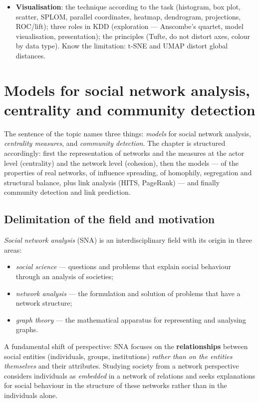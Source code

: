 \documentclass[11pt,a4paper]{article}
\theoremstyle{definition}
\begin{document}
\begin{itemize}
      interestingness of the patterns, and the user's evaluation. The first two are objective, the
      third subjective. \textbf{Four criteria of interesting knowledge}: comprehensibility,
      validity, usefulness, novelty.
\item \textbf{Visualisation}: the technique according to the task (histogram, box plot, scatter,
      SPLOM, parallel coordinates, heatmap, dendrogram, projections, ROC/lift); three roles in KDD
      (exploration --- Anscombe's quartet, model visualisation, presentation); the principles
      (Tufte, do not distort axes, colour by data type). Know the limitation: t-SNE and UMAP distort
      global distances.
\end{itemize}

\newpage
\section{Models for social network analysis, centrality and community detection}
\label{sec:sna}

The sentence of the topic names three things: \emph{models} for social network analysis,
\emph{centrality measures}, and \emph{community detection}. The chapter is structured accordingly:
first the representation of networks and the measures at the actor level (centrality) and the
network level (cohesion), then the models --- of the properties of real networks, of influence
spreading, of homophily, segregation and structural balance, plus link analysis (HITS, PageRank)
--- and finally community detection and link prediction.

\subsection{Delimitation of the field and motivation}

\begin{defbox}
\emph{Social network analysis} (SNA) is an interdisciplinary field with its origin in three areas:
\begin{itemize}
\item \emph{social science} --- questions and problems that explain social behaviour through an
      analysis of societies;
\item \emph{network analysis} --- the formulation and solution of problems that have a network
      structure;
\item \emph{graph theory} --- the mathematical apparatus for representing and analysing graphs.
\end{itemize}
A fundamental shift of perspective: SNA focuses on the \textbf{relationships} between social
entities (individuals, groups, institutions) \emph{rather than on the entities themselves} and their
attributes. Studying society from a network perspective considers individuals as \emph{embedded} in
a network of relations and seeks explanations for social behaviour in the structure of these
networks rather than in the individuals alone.
\end{defbox}
\end{document}
